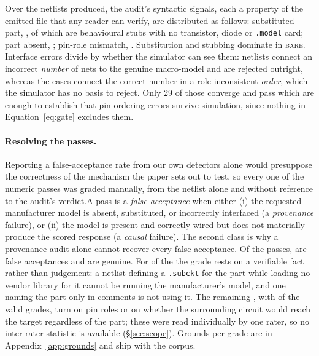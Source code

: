 Over the \NumNetlists{} netlists produced, the audit's syntactic signals,
each a property of the emitted file that any reader can verify, are
distributed as follows: substituted part, \FlagSubstituted{}, of which \FlagStub{} are
behavioural stubs with no transistor, diode or \texttt{.model} card; part
absent, \FlagNoPart{}; pin-role mismatch, \FlagPinRole{}. Substitution and
stubbing dominate in \textsc{bare}. Interface errors divide by whether the
simulator can see them: \PinCountMismatch{} netlists connect an incorrect
\emph{number} of nets to the genuine macro-model and are rejected outright,
whereas the \FlagPinRole{} cases connect the correct number in a
role-inconsistent \emph{order}, which the simulator has no basis to reject.
Only 29 of those converge and \PinRolePassing{} pass which are enough to establish
that pin-ordering errors survive simulation, since nothing in
Equation~\ref{eq:gate} excludes them.

\paragraph{Resolving the passes.}
Reporting a false-acceptance rate from our own detectors alone would
presuppose the correctness of the mechanism the paper sets out to test, so
every one of the \NumNumericPass{} numeric passes was graded manually, from
the netlist alone and without reference to the audit's verdict.A pass is a
\emph{false acceptance} when either (i) the requested manufacturer model is
absent, substituted, or incorrectly interfaced (a \emph{provenance}
failure), or (ii) the model is present and correctly wired but does not
materially produce the scored response (a \emph{causal} failure). The second
class is why a provenance audit alone cannot recover every false acceptance.
Of the \NumNumericPass{} passes, \FalseAcceptTotal{} are false acceptances and
\LabelledReal{} are genuine. For \ConfTP{} of the \FalseAcceptTotal{} the
grade rests on a verifiable fact rather than judgement: a netlist defining a
\texttt{.subckt} for the part while loading no vendor library for it cannot be
running the manufacturer's model, and one naming the part only in comments is
not using it. The remaining \GroundsFakeRead{}, with
\GroundsValidRead{} of the valid grades, turn on pin roles or on whether the
surrounding circuit would reach the target regardless of the part; these were
read individually by one rater, so no inter-rater statistic is available
(\S\ref{sec:scope}). Grounds per grade are in Appendix~\ref{app:grounds} and
ship with the corpus.



